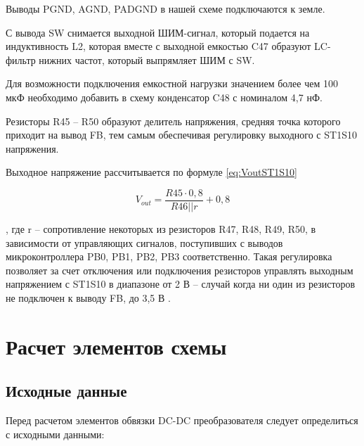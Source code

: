 Выводы PGND, AGND, PADGND в нашей схеме подключаются к земле. 

С вывода SW снимается выходной ШИМ-сигнал, который подается на индуктивность L2, которая вместе с 
выходной емкостью C47 образуют LC-фильтр нижних частот, который выпрямляет ШИМ с SW. 

Для возможности подключения емкостной нагрузки значением более чем 100 мкФ необходимо добавить в схему 
конденсатор C48 с номиналом 4,7 нФ. 

Резисторы R45 -- R50 образуют делитель напряжения, средняя точка которого приходит на вывод FB, тем самым 
обеспечивая регулировку выходного с ST1S10 напряжения. 

Выходное напряжение рассчитывается по формуле \ref{eq:VoutST1S10}

\begin{equation}
    V_{out} = \frac{R45 \cdot 0,8}{R46 || r} + 0,8 
    \label{eq:VoutST1S10}
\end{equation}

, где r -- сопротивление некоторых из резисторов R47, R48, R49, R50, 
в зависимости от управляющих сигналов, поступивших с выводов микроконтроллера  PB0, PB1, PB2, PB3 
соответственно. Такая регулировка позволяет за счет отключения или подключения резисторов управлять 
выходным напряжением с ST1S10 в диапазоне от 2 В -- случай когда ни один из резисторов не подключен к 
выводу FB, до 3,5 В \cite{ST1S10:datasheet}. 


\section{Расчет элементов схемы}
\subsection{Исходные данные}
\hspace{1cm} 

Перед расчетом элементов обвязки DC-DC преобразователя следует определиться с исходными данными:

